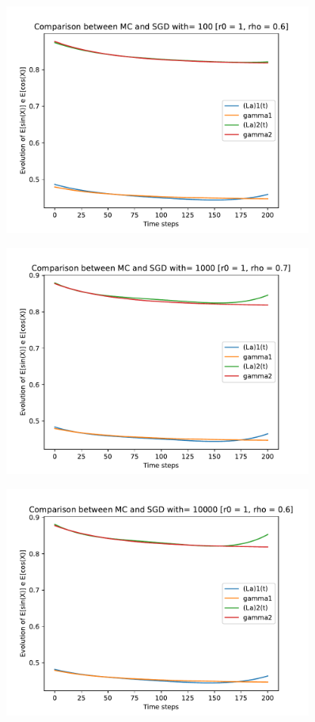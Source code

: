 \documentclass[a4paper,11pt,openright]{report}
\begin{document}
\begin{figure}[H]
\centering
\includegraphics[width=0.9\textwidth]{images/graphics T = 2/n = 4, M = 100 sine and cosine.pdf}
\end{figure}
\begin{figure}[H]
\centering
\includegraphics[width=0.9\textwidth]{images/graphics T = 2/n = 4, M = 1000 sine and cosine.pdf}
\end{figure}
\begin{figure}[H]
\centering
\includegraphics[width=0.9\textwidth]{images/graphics T = 2/n = 4, M = 10000 sine and cosine.pdf}
\end{figure}
\newpage
\end{document}
